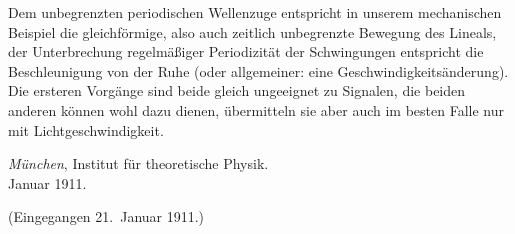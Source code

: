 \documentclass[12pt,a4paper]{article}
\begin{document}
Dem unbegrenzten periodischen Wellenzuge entspricht in unserem mechanischen Beispiel die gleichförmige, also auch zeitlich unbegrenzte Bewegung des Lineals, der Unterbrechung regelmäßiger Periodizität der Schwingungen entspricht die Beschleunigung von der Ruhe (oder allgemeiner: eine Geschwindigkeitsänderung).
Die ersteren Vorgänge sind beide gleich ungeeignet zu Signalen, die beiden anderen können wohl dazu dienen, übermitteln sie aber auch im besten Falle nur mit Lichtgeschwindigkeit.

\emph{München}, Institut für theoretische Physik.\\
Januar 1911.

\begin{flushright}\small (Eingegangen 21.~Januar 1911.)\end{flushright}
\end{document}
